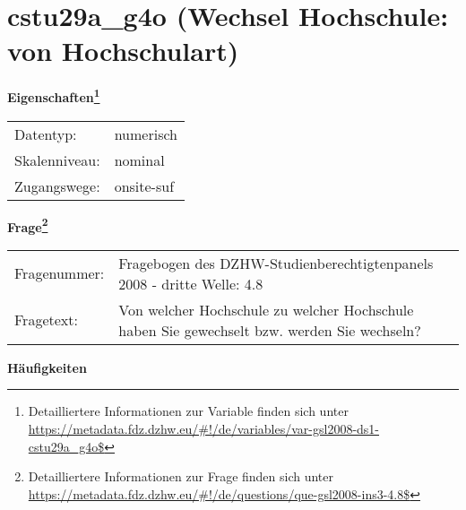 
    \setcounter{footnote}{0}

    \vspace*{-1.8cm}
	\section{cstu29a\_g4o (Wechsel Hochschule: von Hochschulart)}
	\label{section:cstu29a_g4o}



    \vspace*{0.5cm}
    \noindent\textbf{Eigenschaften\footnote{Detailliertere Informationen zur Variable finden sich unter
		\url{https://metadata.fdz.dzhw.eu/\#!/de/variables/var-gsl2008-ds1-cstu29a_g4o$}}}\\
	\begin{tabularx}{\hsize}{@{}lX}
	Datentyp: & numerisch \\
	Skalenniveau: & nominal \\
	Zugangswege: &
	  onsite-suf
 \\
    \end{tabularx}



				\vspace*{0.5cm}
                \noindent\textbf{Frage\footnote{Detailliertere Informationen zur Frage finden sich unter
		              \url{https://metadata.fdz.dzhw.eu/\#!/de/questions/que-gsl2008-ins3-4.8$}}}\\
				\begin{tabularx}{\hsize}{@{}lX}
					Fragenummer: &
					  Fragebogen des DZHW-Studienberechtigtenpanels 2008 - dritte Welle:
					  4.8
 \\
					Fragetext: & Von welcher Hochschule zu welcher Hochschule haben Sie gewechselt bzw. werden Sie wechseln? \\
				\end{tabularx}





        		\vspace*{0.5cm}
                \noindent\textbf{Häufigkeiten}

